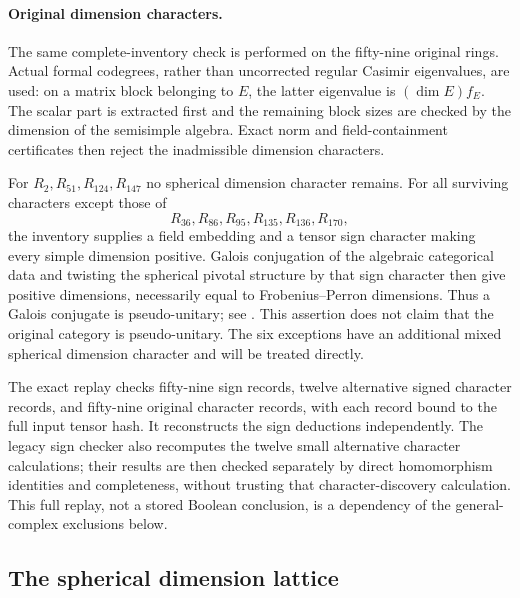 \paragraph{Original dimension characters.}
The same complete-inventory check is performed on the fifty-nine original
rings. Actual formal codegrees, rather than uncorrected regular Casimir
eigenvalues, are used: on a matrix block belonging to $E$, the latter
eigenvalue is $(\dim E)f_E$. The scalar part is extracted first and the
remaining block sizes are checked by the dimension of the semisimple
algebra. Exact norm and field-containment certificates then reject the
inadmissible dimension characters.

For $R_2,R_{51},R_{124},R_{147}$ no spherical dimension character remains.
For all surviving characters except those of
\[
 R_{36},R_{86},R_{95},R_{135},R_{136},R_{170},
\]
the inventory supplies a field embedding and a tensor sign character
making every simple dimension positive. Galois conjugation of the
algebraic categorical data and twisting the spherical pivotal structure
by that sign character then give positive dimensions, necessarily equal
to Frobenius--Perron dimensions. Thus a Galois conjugate is pseudo-unitary;
see \cite[Section~8.4]{ENO}. This assertion does not claim that the original
category is pseudo-unitary. The six exceptions have an additional mixed
spherical dimension character and will be treated directly.

The exact replay checks fifty-nine sign records, twelve alternative signed
character records, and fifty-nine original character records, with each
record bound to the full input tensor hash. It reconstructs the sign
deductions independently. The legacy sign checker also recomputes the
twelve small alternative character calculations; their results are then
checked separately by direct homomorphism identities and completeness,
without trusting that character-discovery calculation. This full replay,
not a stored Boolean conclusion, is a dependency of the general-complex
exclusions below.

\subsection{The spherical dimension lattice}
\label{subsec:r11-dimension-lattice}

